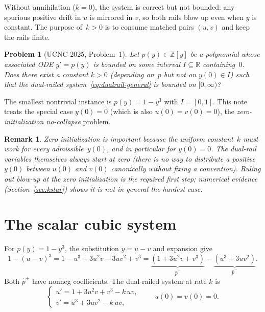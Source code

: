 \documentclass[11pt]{article}
\newtheorem{remark}[theorem]{Remark}
\newtheorem{problem}[theorem]{Problem}
\newcommand{\R}{\mathbb{R}}
\newcommand{\Z}{\mathbb{Z}}
\begin{document}
Without annihilation ($k = 0$), the system is correct but not bounded: any
spurious positive drift in $u$ is mirrored in $v$, so both rails blow up even
when $y$ is constant.  The purpose of~$k > 0$ is to consume matched pairs
$(u, v)$ and keep the rails finite.

\begin{problem}[UCNC 2025, Problem~1]\label{prob:UCNC25}
Let $p(y) \in \Z[y]$ be a polynomial whose associated ODE $y' = p(y)$ is bounded
on some interval $I \subseteq \R$ containing~$0$.  Does there exist a
\emph{constant} $k > 0$ (depending on~$p$ but not on $y(0) \in I$) such that the
dual-railed system~\eqref{eq:dualrail-general} is bounded on $[0, \infty)$?
\end{problem}

The smallest nontrivial instance is $p(y) = 1 - y^{3}$ with $I = [0, 1]$.  This
note treats the special case $y(0) = 0$ (which is also $u(0) = v(0) = 0$), the
\emph{zero-initialization no-collapse} problem.

\begin{remark}
Zero initialization is important because the uniform constant~$k$ must work for
every admissible~$y(0)$, and in particular for $y(0) = 0$.  The dual-rail
variables themselves always start at zero (there is no way to distribute a
positive $y(0)$ between $u(0)$ and $v(0)$ canonically without fixing a
convention).  Ruling out blow-up at the zero initialization is the required
first step; numerical evidence (Section~\ref{sec:kstar}) shows it is not in
general the hardest case.
\end{remark}

\section{The scalar cubic system}

For $p(y) = 1 - y^{3}$, the substitution $y = u - v$ and expansion give
\[
  1 - (u - v)^{3}
  = 1 - u^{3} + 3 u^{2} v - 3 u v^{2} + v^{3}
  = \underbrace{(1 + 3 u^{2} v + v^{3})}_{\hat{p}^{+}}
    - \underbrace{(u^{3} + 3 u v^{2})}_{\hat{p}^{-}}.
\]
Both $\hat{p}^{\pm}$ have nonneg coefficients.  The dual-railed system at rate
$k$ is
\begin{equation}\label{eq:dualrail-cubic}
  \begin{cases}
    u' = 1 + 3 u^{2} v + v^{3} - k \, u v, \\[3pt]
    v' = u^{3} + 3 u v^{2} - k \, u v,
  \end{cases}
  \qquad
  u(0) = v(0) = 0.
\end{equation}
\end{document}
